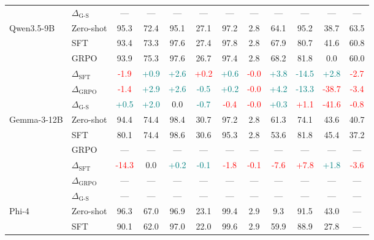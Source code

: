 \begin{table}[t]
\begin{tabular}{llcccccccccc}
 & $\Delta_{\text{G-S}}$ & --- & --- & --- & --- & --- & --- & --- & --- & --- & --- \\
\addlinespace
Qwen3.5-9B & Zero-shot & 95.3 & 72.4 & 95.1 & 27.1 & 97.2 & 2.8 & 64.1 & 95.2 & 38.7 & 63.5 \\
 & SFT & 93.4 & 73.3 & 97.6 & 27.4 & 97.8 & 2.8 & 67.9 & 80.7 & 41.6 & 60.8 \\
 & GRPO & 93.9 & 75.3 & 97.6 & 26.7 & 97.4 & 2.8 & 68.2 & 81.8 & 0.0 & 60.0 \\
 & $\Delta_{\text{SFT}}$ & \textcolor{red}{-1.9} & \textcolor{teal}{+0.9} & \textcolor{teal}{+2.6} & \textcolor{red}{+0.2} & \textcolor{teal}{+0.6} & \textcolor{red}{-0.0} & \textcolor{teal}{+3.8} & \textcolor{teal}{-14.5} & \textcolor{teal}{+2.8} & \textcolor{red}{-2.7} \\
 & $\Delta_{\text{GRPO}}$ & \textcolor{red}{-1.4} & \textcolor{teal}{+2.9} & \textcolor{teal}{+2.6} & \textcolor{teal}{-0.5} & \textcolor{teal}{+0.2} & \textcolor{red}{-0.0} & \textcolor{teal}{+4.2} & \textcolor{teal}{-13.3} & \textcolor{red}{-38.7} & \textcolor{red}{-3.4} \\
 & $\Delta_{\text{G-S}}$ & \textcolor{teal}{+0.5} & \textcolor{teal}{+2.0} & 0.0 & \textcolor{teal}{-0.7} & \textcolor{red}{-0.4} & \textcolor{red}{-0.0} & \textcolor{teal}{+0.3} & \textcolor{red}{+1.1} & \textcolor{red}{-41.6} & \textcolor{red}{-0.8} \\
\addlinespace
Gemma-3-12B & Zero-shot & 94.4 & 74.4 & 98.4 & 30.7 & 97.2 & 2.8 & 61.3 & 74.1 & 43.6 & 40.7 \\
 & SFT & 80.1 & 74.4 & 98.6 & 30.6 & 95.3 & 2.8 & 53.6 & 81.8 & 45.4 & 37.2 \\
 & GRPO & --- & --- & --- & --- & --- & --- & --- & --- & --- & --- \\
 & $\Delta_{\text{SFT}}$ & \textcolor{red}{-14.3} & 0.0 & \textcolor{teal}{+0.2} & \textcolor{teal}{-0.1} & \textcolor{red}{-1.8} & \textcolor{red}{-0.1} & \textcolor{red}{-7.6} & \textcolor{red}{+7.8} & \textcolor{teal}{+1.8} & \textcolor{red}{-3.6} \\
 & $\Delta_{\text{GRPO}}$ & --- & --- & --- & --- & --- & --- & --- & --- & --- & --- \\
 & $\Delta_{\text{G-S}}$ & --- & --- & --- & --- & --- & --- & --- & --- & --- & --- \\
\addlinespace
Phi-4 & Zero-shot & 96.3 & 67.0 & 96.9 & 23.1 & 99.4 & 2.9 & 9.3 & 91.5 & 43.0 & --- \\
 & SFT & 90.1 & 62.0 & 97.0 & 22.0 & 99.6 & 2.9 & 59.9 & 88.9 & 27.8 & --- \\

\end{tabular}
\end{table}

